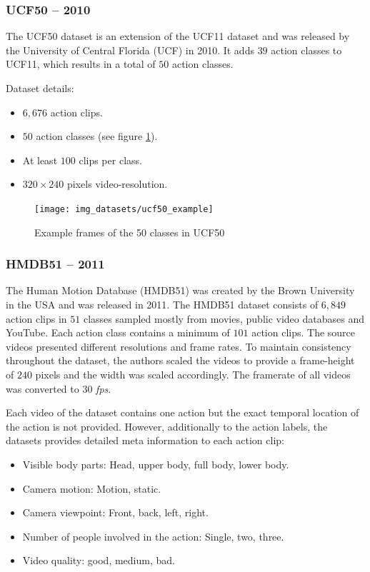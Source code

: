 \subsubsection{UCF50 -- 2010}
The UCF50 dataset \cite{reddy_recognizing_2013} is an extension of the UCF11 dataset and was released by the University of Central Florida (UCF) in 2010.
It adds $39$ action classes to UCF11, which results in a total of $50$ action classes.

Dataset details: \cite{kang_review_2016}
\begin{itemize}
    \item $6,676$ action clips.
    \item $50$ action classes (see figure \ref{fig:ucf50_example}).
    \item At least $100$ clips per class.
    \item $320 \times 240$ pixels video-resolution.
\end{itemize}

\begin{figure}[H]
    \centering
    \texttt{[image: img\_datasets/ucf50\_example]}
    \caption{Example frames of the 50 classes in UCF50 \cite{reddy_recognizing_2013}}
    \label{fig:ucf50_example}
\end{figure}


\subsubsection{HMDB51 -- 2011}
The Human Motion Database (HMDB51) \cite{kuehne_hmdb:_2011} was created by the Brown University in the USA and was released in 2011.
The HMDB51 dataset consists of $6,849$ action clips in $51$ classes sampled mostly from movies, public video databases and YouTube.
Each action class contains a minimum of $101$ action clips.
The source videos presented different resolutions and frame rates.
To maintain consistency throughout the dataset, the authors scaled the videos to provide a frame-height of $240$ pixels and the width was scaled accordingly.
The framerate of all videos was converted to $30$ \textit{fps}.

Each video of the dataset contains one action but the exact temporal location of the action is not provided.
However, additionally to the action labels, the datasets provides detailed meta information to each action clip: \cite{_serre_????}
\begin{itemize}
    \item Visible body parts: Head, upper body, full body, lower body.
    \item Camera motion: Motion, static.
    \item Camera viewpoint: Front, back, left, right.
    \item Number of people involved in the action: Single, two, three.
    \item Video quality: good, medium, bad.
\end{itemize}

